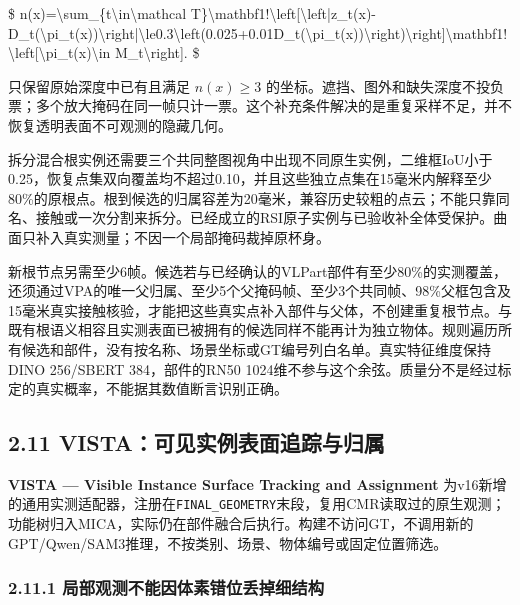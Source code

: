 \documentclass[UTF8,fontset=fandol]{ctexart}
\begin{document}
\$
n(x)=\textbackslash{}sum\_\{t\textbackslash{}in\textbackslash{}mathcal T\}\textbackslash{}mathbf1!\textbackslash{}left[\textbackslash{}left|z\_t(x)-D\_t(\textbackslash{}pi\_t(x))\textbackslash{}right|\textbackslash{}le0.3\textbackslash{}left(0.025+0.01D\_t(\textbackslash{}pi\_t(x))\textbackslash{}right)\textbackslash{}right]\textbackslash{}mathbf1!\textbackslash{}left[\textbackslash{}pi\_t(x)\textbackslash{}in M\_t\textbackslash{}right].
\$



只保留原始深度中已有且满足 $n(x)\ge3$ 的坐标。遮挡、图外和缺失深度不投负票；多个放大掩码在同一帧只计一票。这个补充条件解决的是重复采样不足，并不恢复透明表面不可观测的隐藏几何。



拆分混合根实例还需要三个共同整图视角中出现不同原生实例，二维框IoU小于0.25，恢复点集双向覆盖均不超过0.10，并且这些独立点集在15毫米内解释至少80\%的原根点。根到候选的归属容差为20毫米，兼容历史较粗的点云；不能只靠同名、接触或一次分割来拆分。已经成立的RSI原子实例与已验收补全体受保护。曲面只补入真实测量；不因一个局部掩码裁掉原杯身。



新根节点另需至少6帧。候选若与已经确认的VLPart部件有至少80\%的实测覆盖，还须通过VPA的唯一父归属、至少5个父掩码帧、至少3个共同帧、98\%父框包含及15毫米真实接触核验，才能把这些真实点补入部件与父体，不创建重复根节点。与既有根语义相容且实测表面已被拥有的候选同样不能再计为独立物体。规则遍历所有候选和部件，没有按名称、场景坐标或GT编号列白名单。真实特征维度保持DINO 256/SBERT 384，部件的RN50 1024维不参与这个余弦。质量分不是经过标定的真实概率，不能据其数值断言识别正确。



\subsection*{2.11 VISTA：可见实例表面追踪与归属}

\textbf{VISTA — Visible Instance Surface Tracking and Assignment} 为v16新增的通用实测适配器，注册在\texttt{FINAL\_\allowbreak{}GEOMETRY}末段，复用CMR读取过的原生观测；功能树归入MICA，实际仍在部件融合后执行。构建不访问GT，不调用新的GPT/Qwen/SAM3推理，不按类别、场景、物体编号或固定位置筛选。



\subsubsection*{2.11.1 局部观测不能因体素错位丢掉细结构}
\end{document}
